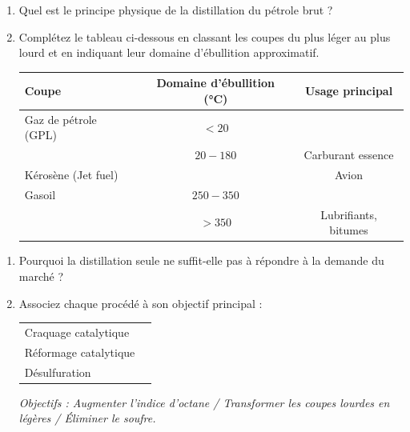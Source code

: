 \documentclass[11pt]{article}
\begin{document}
\begin{exercice}
\begin{enumerate}
    \item Quel est le principe physique de la distillation du pétrole brut ? \underline{\hspace{6cm}}
    \item Complétez le tableau ci-dessous en classant les coupes du plus léger au plus lourd et en indiquant leur domaine d'ébullition approximatif.
    \begin{tabular}{|l|c|c|}
    \hline
    \textbf{Coupe} & \textbf{Domaine d'ébullition (\si{\celsius})} & \textbf{Usage principal} \\ \hline
    Gaz de pétrole (GPL) & $< 20$ & \underline{\hspace{3cm}} \\ \hline
    \underline{\hspace{2cm}} & $20 - 180$ & Carburant essence \\ \hline
    Kérosène (Jet fuel) & \underline{\hspace{2cm}} & Avion \\ \hline
    Gasoil & $250 - 350$ & \underline{\hspace{3cm}} \\ \hline
    \underline{\hspace{2cm}} & $> 350$ & Lubrifiants, bitumes \\ \hline
    \end{tabular}
\end{enumerate}
\end{exercice}

\begin{exercice}
\begin{enumerate}
    \item Pourquoi la distillation seule ne suffit-elle pas à répondre à la demande du marché ? \underline{\hspace{6cm}}
    \item Associez chaque procédé à son objectif principal :
    \begin{tabular}{ll}
    Craquage catalytique & \underline{\hspace{4cm}} \\
    Réformage catalytique & \underline{\hspace{4cm}} \\
    Désulfuration & \underline{\hspace{4cm}} \\
    \end{tabular}
    \textit{Objectifs : Augmenter l'indice d'octane / Transformer les coupes lourdes en légères / Éliminer le soufre.}
\end{enumerate}
\end{exercice}
\end{document}
